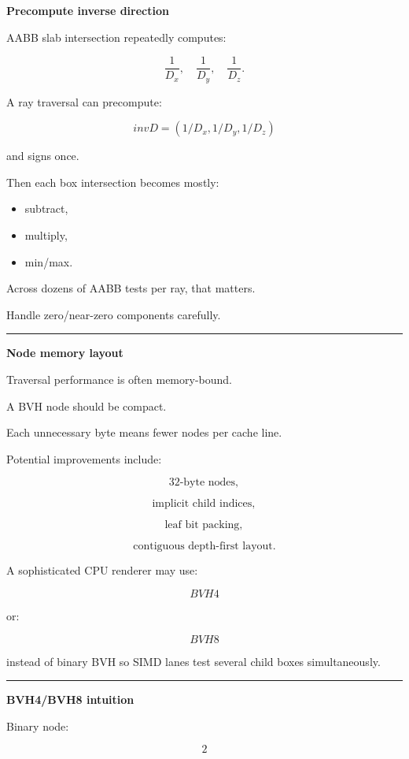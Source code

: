 \textbf{Precompute inverse direction}

AABB slab intersection repeatedly computes:

\[
\frac1{D_x},
\quad
\frac1{D_y},
\quad
\frac1{D_z}.
\]

A ray traversal can precompute:

\[
\boxed{
invD=
(1/D_x,1/D_y,1/D_z)
}
\]

and signs once.

Then each box intersection becomes mostly:

\begin{itemize}
\tightlist
\item
  subtract,
\item
  multiply,
\item
  min/max.
\end{itemize}

Across dozens of AABB tests per ray, that matters.

Handle zero/near-zero components carefully.

\begin{center}\rule{0.5\linewidth}{0.5pt}\end{center}

\textbf{Node memory layout}

Traversal performance is often memory-bound.

A BVH node should be compact.

Each unnecessary byte means fewer nodes per cache line.

Potential improvements include:

\[
\text{32-byte nodes},
\]

\[
\text{implicit child indices},
\]

\[
\text{leaf bit packing},
\]

\[
\text{contiguous depth-first layout}.
\]

A sophisticated CPU renderer may use:

\[
BVH4
\]

or:

\[
BVH8
\]

instead of binary BVH so SIMD lanes test several child boxes simultaneously.

\begin{center}\rule{0.5\linewidth}{0.5pt}\end{center}

\textbf{BVH4/BVH8 intuition}

Binary node:

\[
2
\]

